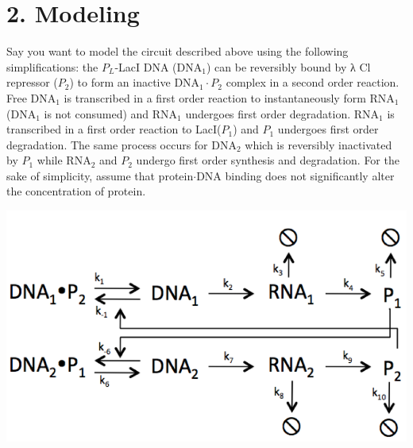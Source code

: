 \documentclass[11pt]{article}
\begin{document}
\section*{2. Modeling}

Say you want to model the circuit described above using the following simplifications: the $P_{L}$-LacI DNA (DNA$_{1}$) can be reversibly bound by λ Cl repressor ($P_{2}$) to form an inactive DNA$_{1}\cdot P_{2}$ complex in a second order reaction. Free DNA$_{1}$ is transcribed in a first order reaction to instantaneously form RNA$_{1}$ (DNA$_{1}$ is not consumed) and RNA$_{1}$ undergoes first order degradation. RNA$_{1}$ is transcribed in a first order reaction to LacI($P_{1}$) and $P_{1}$ undergoes first order degradation. The same process occurs for DNA$_{2}$ which is reversibly inactivated by $P_{1}$ while RNA$_{2}$ and $P_{2}$ undergo first order synthesis and degradation. For the sake of simplicity, assume that protein$\cdot$DNA binding does not significantly alter the concentration of protein. 




{
  \centering
  \includegraphics[scale=0.3]{ps1_q2.png} \par
}
\end{document}
